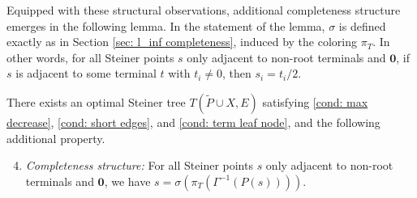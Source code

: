 \documentclass{theoretics}
\newcommand{\1}{\textbf{1}}
\renewcommand{\tilde}{\widetilde}
\begin{document}
Equipped with these structural observations, additional completeness structure emerges in the following lemma. In the statement of the lemma, $\sigma$ is defined exactly as in Section \ref{sec: l_inf completeness}, induced by the coloring $\pi_T$. In other words, for all Steiner points $s$ only adjacent to non-root terminals and $\mathbf{0}$, if $s$ is adjacent to some terminal $t$ with $t_i \neq 0$, then $s_i = t_i /2$.

\begin{lemma} \label{lem: coordinates of 1/2}
There exists an optimal Steiner tree  $T(\tilde{P} \cup X, E)$ satisfying \ref{cond: max decrease}, \ref{cond: short edges}, and \ref{cond: term leaf node}, and the following additional property.
\begin{enumerate}[label=(P\arabic*)]
\setcounter{enumi}{3}
    \item \textit{Completeness structure:}  For all Steiner points $s$ only adjacent to non-root terminals and $\mathbf{0}$, we have $s = \sigma(\pi_T(\Gamma^{-1}(P(s))))$. \label{cond: completeness structure}
\end{enumerate}
\end{lemma}
\end{document}
